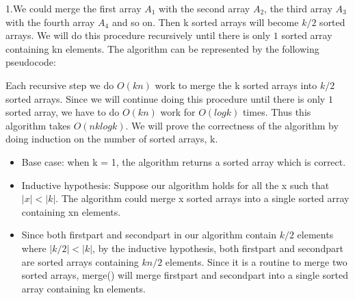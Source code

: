 \documentclass[11pt]{article}
\begin{document}
\begin{solution}
1.We could merge the first array $A_1$ with the second array $A_2$, the third array $A_3$ with the fourth array $A_4$ and so on. Then k sorted arrays will become $k/2$ sorted arrays. We will do this procedure recursively until there is only $1$ sorted array containing kn elements.
\newline
\newline
The algorithm can be represented by the following pseudocode:

\begin{quote}
        \newline
\end{quote}
Each recursive step we do $O(kn)$ work to merge the k sorted arrays into $k/2$ sorted arrays. Since we will continue doing this procedure until there is only $1$ sorted array, we have to do $O(kn)$ work for $O(logk)$ times. Thus this algorithm takes $O(nklogk)$.
\newline
\newline
We will prove the correctness of the algorithm by doing induction on the number of sorted arrays, k.
\begin{itemize}
\item Base case: when k = 1, the algorithm returns a sorted array which is correct.
\item Inductive hypothesis: Suppose our algorithm holds for all the x such that $|x|<|k|$. The algorithm could merge x sorted arrays into a single sorted array containing xn elements.
\item Since both firstpart and secondpart in our algorithm contain $k/2$ elements where $|k/2|<|k|$, by the inductive hypothesis, both firstpart and secondpart are sorted arrays containing $kn/2$ elements. Since it is a routine to merge two sorted arrays, merge() will merge firstpart and secondpart into a single sorted array containing kn elements.

\end{itemize}
\end{solution}
\end{document}
